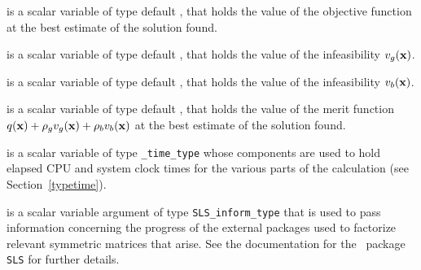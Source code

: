 \begin{description}
 is a scalar variable of type default \realdp, that holds the
value of the objective function at the best estimate of the solution found.

 is a scalar variable of type default \realdp, that holds the
value of the infeasibility $v_g({\mathbf{x}})$.

 is a scalar variable of type default \realdp, that holds the
value of the infeasibility $v_b({\mathbf{x}})$.

 is a scalar variable of type default \realdp, that holds the
value of the merit function $q({\mathbf{x}}) + \rho_g v_g({\mathbf{x}}) + \rho_b v_b({\mathbf{x}})$
at the best estimate of the solution found.

 is a scalar variable of type {\tt \packagename\_time\_type}
whose components are used to hold elapsed CPU  and system clock
times for the various parts of the calculation (see Section~\ref{typetime}).

 is a scalar variable argument of type
{\tt SLS\_inform\_type} that is used to pass information
concerning the progress of the external packages used to
factorize relevant symmetric matrices that arise.
See the documentation for the \galahad\ package {\tt SLS} for further details.

\end{description}
